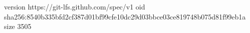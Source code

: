 version https://git-lfs.github.com/spec/v1
oid sha256:8540b335bfd2cf387d01bf99cfe10dc29d03bbce03ce819748b075d81f99eb1a
size 3505
